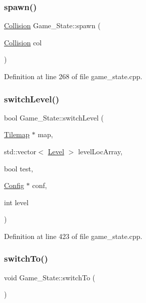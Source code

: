\subsubsection{\texorpdfstring{spawn()}{spawn()}}
{\footnotesize\ttfamily \hyperlink{class_collision}{Collision} Game\+\_\+\+State\+::spawn (\begin{DoxyParamCaption}\item[{\hyperlink{class_collision}{Collision}}]{col }\end{DoxyParamCaption})}



Definition at line 268 of file game\+\_\+state.\+cpp.

\hypertarget{class_game___state_acf99f3862148f13c48e9644b7bd5e64b}{}\label{class_game___state_acf99f3862148f13c48e9644b7bd5e64b} 
\subsubsection{\texorpdfstring{switch\+Level()}{switchLevel()}}
{\footnotesize\ttfamily bool Game\+\_\+\+State\+::switch\+Level (\begin{DoxyParamCaption}\item[{\hyperlink{class_tilemap}{Tilemap} $\ast$}]{map,  }\item[{std\+::vector$<$ \hyperlink{class_level}{Level} $>$}]{level\+Loc\+Array,  }\item[{bool}]{test,  }\item[{\hyperlink{class_config}{Config} $\ast$}]{conf,  }\item[{int}]{level }\end{DoxyParamCaption})}



Definition at line 423 of file game\+\_\+state.\+cpp.

\hypertarget{class_game___state_aaaaa14909458922108ecc2495986db3d}{}\label{class_game___state_aaaaa14909458922108ecc2495986db3d} 
\subsubsection{\texorpdfstring{switch\+To()}{switchTo()}}
{\footnotesize\ttfamily void Game\+\_\+\+State\+::switch\+To (\begin{DoxyParamCaption}{ }\end{DoxyParamCaption})}



